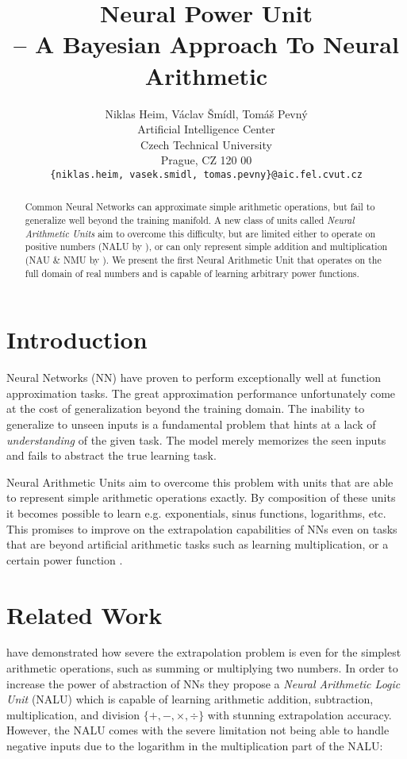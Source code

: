 \documentclass[9pt]{article}
\title{Neural Power Unit \\-- A Bayesian Approach To Neural Arithmetic}
\author{
  Niklas Heim,
  V\'aclav \v Sm\'idl,
  Tom\'a\v s Pevn\'y \\
  Artificial Intelligence Center\\
  Czech Technical University\\
  Prague, CZ 120 00\\
  \texttt{\{niklas.heim, vasek.smidl, tomas.pevny\}@aic.fel.cvut.cz}\\
}
\begin{document}
\maketitle

\begin{abstract}
  Common Neural Networks can approximate simple arithmetic operations, but fail
  to generalize well beyond the training manifold. A new class of units called
  \emph{Neural Arithmetic Units} aim to overcome this difficulty, but are limited
  either to operate on positive numbers (NALU by
  \citet{trask_neural_2018}), or can only represent simple addition and
  multiplication (NAU \& NMU by \citet{madsen_neural_2020}).
  We present the first Neural Arithmetic Unit that operates on the full domain
  of real numbers and is capable of learning arbitrary power functions.
\end{abstract}


\section{Introduction}%
\label{sec:introduction}

Neural Networks (NN) have proven to perform exceptionally well at function
approximation tasks. The great approximation
performance unfortunately come at the cost of generalization beyond the
training domain.  The inability to generalize to unseen
inputs is a fundamental problem that hints at a lack of \emph{understanding} of
the given task. The model merely memorizes the seen inputs and fails to
abstract the true learning task.

Neural Arithmetic Units aim to overcome this problem with units that are able
to represent simple arithmetic operations exactly. By composition of these
units it becomes possible to learn e.g. exponentials, sinus functions,
logarithms, etc. This promises to improve on the extrapolation capabilities of
NNs even on tasks that are beyond artificial arithmetic tasks such as learning
multiplication, or a certain power function .

\section{Related Work}%
\label{sec:related_work}

\citet{trask_neural_2018} have demonstrated how severe the extrapolation
problem is even for the simplest arithmetic operations, such as summing or
multiplying two numbers.  In order to increase the power of abstraction of NNs
they propose a \emph{Neural Arithmetic Logic Unit} (NALU) which is capable of
learning arithmetic addition, subtraction, multiplication, and division
$\{+,-,\times,\div\}$ with stunning extrapolation accuracy.  However, the NALU
comes with the severe limitation not being able to handle negative inputs due
to the logarithm in the multiplication part of the NALU:
\end{document}

